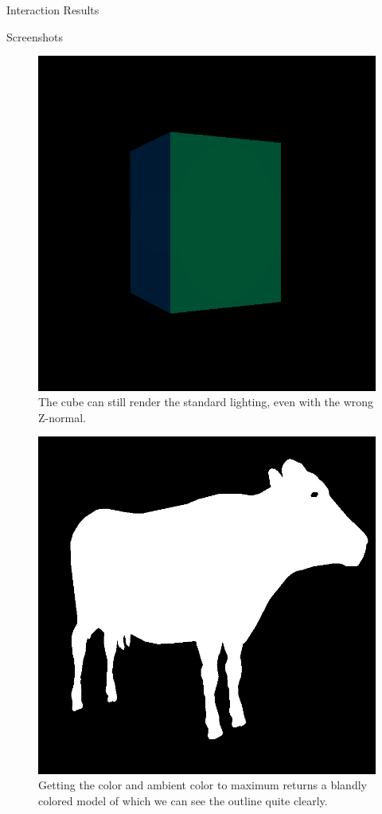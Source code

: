 \documentclass{article}
\begin{document}
\begin{section}{Interaction Results}
\begin{multicols}{2}
\begin{subsection}{Screenshots}
    \begin{figure}[H]
     \includegraphics[width=\linewidth]{./res/coolcube.png}
     \caption{The cube can still render the standard lighting, even with the
wrong Z-normal.}
    \end{figure}

    \begin{figure}[H]
     \includegraphics[width=\linewidth]{./res/maxcolor.png}
     \caption{Getting the color and ambient color to maximum returns a blandly
colored model of which we can see the outline quite clearly.}
    \end{figure}


\end{subsection}
\end{multicols}
\end{section}
\end{document}
